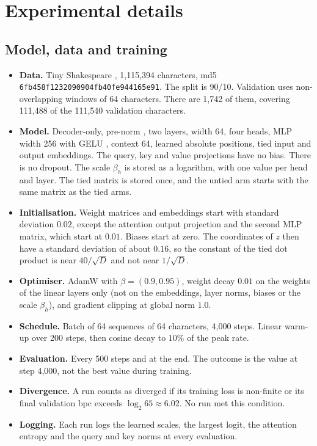 \documentclass[11pt]{article}
\begin{document}
\section{Experimental details}\label{app:setup}

\subsection{Model, data and training}

\begin{itemize}
\item \textbf{Data.} Tiny Shakespeare \citep{karpathy2015}, 1,115,394 characters, md5 \texttt{6fb458f1232090904f\allowbreak b40fe944165e91}. The split is 90/10. Validation uses non-overlapping windows of 64 characters. There are 1,742 of them, covering 111,488 of the 111,540 validation characters.
\item \textbf{Model.} Decoder-only, pre-norm \citep{ba2016}, two layers, width 64, four heads, MLP width 256 with GELU \citep{hendrycks2016}, context 64, learned absolute positions, tied input and output embeddings. The query, key and value projections have no bias. There is no dropout. The scale $\beta_h$ is stored as a logarithm, with one value per head and layer. The tied matrix is stored once, and the untied arm starts with the same matrix as the tied arms.
\item \textbf{Initialisation.} Weight matrices and embeddings start with standard deviation $0.02$, except the attention output projection and the second MLP matrix, which start at $0.01$. Biases start at zero. The coordinates of $z$ then have a standard deviation of about $0.16$, so the constant of the tied dot product is near $40/\sqrt D$ and not near $1/\sqrt D$.
\item \textbf{Optimiser.} AdamW \citep{loshchilov2019adamw} with $\beta=(0.9,0.95)$, weight decay $0.01$ on the weights of the linear layers only (not on the embeddings, layer norms, biases or the scale $\beta_h$), and gradient clipping \citep{pascanu2013} at global norm $1.0$.
\item \textbf{Schedule.} Batch of 64 sequences of 64 characters, 4,000 steps. Linear warm-up over 200 steps, then cosine decay \citep{loshchilov2017sgdr} to $10\%$ of the peak rate.
\item \textbf{Evaluation.} Every 500 steps and at the end. The outcome is the value at step 4,000, not the best value during training.
\item \textbf{Divergence.} A run counts as diverged if its training loss is non-finite or its final validation bpc exceeds $\log_2 65\approx6.02$. No run met this condition.
\item \textbf{Logging.} Each run logs the learned scales, the largest logit, the attention entropy and the query and key norms at every evaluation.
\end{itemize}
\end{document}
